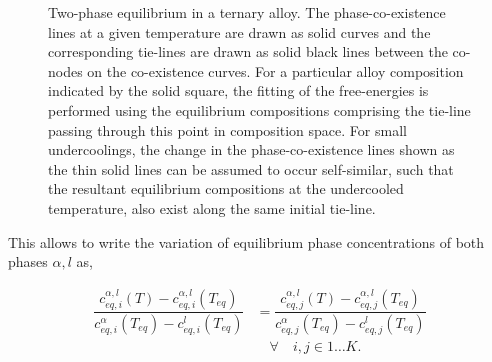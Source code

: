 \documentclass[a4paper,10pt]{article}
\begin{document}
\begin{itemize}
\begin{figure}[!htbp]
\begin{center}
\end{center}
\caption{Two-phase equilibrium in a ternary alloy. The phase-co-existence lines at a given temperature 
are drawn as solid curves and the corresponding tie-lines are drawn as solid black lines between the
co-nodes on the co-existence curves. For a particular alloy composition indicated by the solid square, the 
fitting of the free-energies is performed using the equilibrium compositions comprising the tie-line
passing through this point in composition space. For small undercoolings, the change in the phase-co-existence
lines shown as the thin solid lines can be assumed to occur self-similar, such that the resultant 
equilibrium compositions at the undercooled temperature, also exist along the same initial tie-line.}
\label{Tie_line_assumption}
\end{figure}

This allows to write the variation of equilibrium phase concentrations
of both phases $\alpha,l$ as,

\begin{align}
 \dfrac{c_{eq,i}^{\alpha,l}\left(T\right) - c_{eq,i}^{\alpha,l}\left(T_{eq}\right)}{c_{eq,i}^{\alpha}\left(T_{eq}\right) - c_{eq,i}^{l}\left(T_{eq}\right)}&=\dfrac{c_{eq,j}^
 {\alpha,l}\left(T\right)-c_{eq,j}^{\alpha,l}\left(T_{eq}\right)}{c_{eq,j}^
 {\alpha}\left(T_{eq}\right)-c_{eq,j}^{l}\left(T_{eq}\right)} \nonumber\\ 
 &\quad \forall \quad i,j \in 1 \ldots K. 
\end{align}


\end{itemize}
\end{document}
